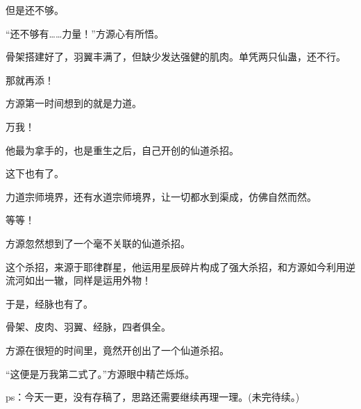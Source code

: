 \begin{this_body}
但是还不够。

“还不够有……力量！”方源心有所悟。

骨架搭建好了，羽翼丰满了，但缺少发达强健的肌肉。单凭两只仙蛊，还不行。

那就再添！

方源第一时间想到的就是力道。

万我！

他最为拿手的，也是重生之后，自己开创的仙道杀招。

这下也有了。

力道宗师境界，还有水道宗师境界，让一切都水到渠成，仿佛自然而然。

等等！

方源忽然想到了一个毫不关联的仙道杀招。

这个杀招，来源于耶律群星，他运用星辰碎片构成了强大杀招，和方源如今利用逆流河如出一辙，同样是运用外物！

于是，经脉也有了。

骨架、皮肉、羽翼、经脉，四者俱全。

方源在很短的时间里，竟然开创出了一个仙道杀招。

“这便是万我第二式了。”方源眼中精芒烁烁。

ps：今天一更，没有存稿了，思路还需要继续再理一理。(未完待续。)

\end{this_body}

